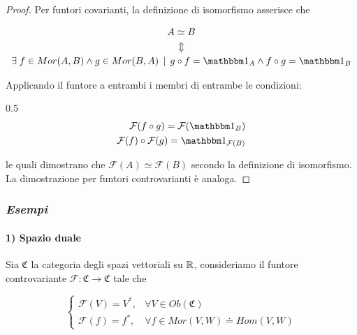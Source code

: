 \begin{proof}
	Per funtori covarianti, la definizione di isomorfismo asserisce che
	
	\begin{gather}
		A \simeq B \nonumber \\
		\Updownarrow\\ %
		\E f \in Mor(A,B) \wedge g \in Mor(B,A) \, \mid \, g \circ f = \bigone_{A} \wedge f \circ g = \bigone_{B} \nonumber
	\end{gather}
	
	Applicando il funtore a entrambi i membri di entrambe le condizioni:
	
		{0.5}{%
				\begin{align}
					\begin{split}
						\mathcal{F}(f \circ g) = \mathcal{F}(\bigone_{B})\\
						\mathcal{F}(f) \circ \mathcal{F}(g) = \bigone_{\mathcal{F}(B)}
					\end{split}
				\end{align}
				}
	
	le quali dimostrano che $ \mathcal{F}(A) \simeq \mathcal{F}(B) $ secondo la definizione di isomorfismo.\\
	La dimostrazione per funtori controvarianti è analoga.
\end{proof}

\subsubsection{\textit{Esempi}}

\paragraph{1) Spazio duale}

Sia $ \mathfrak{C} $ la categoria degli spazi vettoriali su $ \mathbb{R} $, consideriamo il funtore controvariante $ \mathcal{F} : \mathfrak{C} \to \mathfrak{C} $ tale che

\begin{equation}
	\begin{cases}
		\mathcal{F}(V) = V^{*}, & \forall V \in Ob(\mathfrak{C})\\
		\mathcal{F}(f) = f^{*}, & \forall f \in Mor(V,W) \doteq Hom(V,W)
	\end{cases}
\end{equation}

